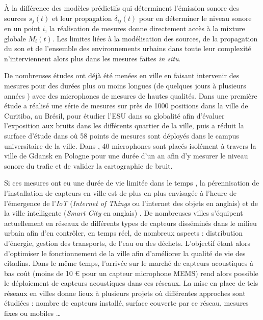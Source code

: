 À la différence des modèles prédictifs qui déterminent l'émission sonore des sources $s_j(t)$ et leur propagation $\delta_{ij}(t)$ pour en déterminer le niveau sonore en un point $i$, la réalisation de mesures donne directement accès à la mixture globale $M_{i}(t)$. Les limites liées à la modélisation des sources, de la propagation du son et de l'ensemble des environnements urbains dans toute leur complexité n'interviennent alors plus dans les mesures faites \textit{in situ}.

De nombreuses études ont déjà été menées en ville en faisant intervenir des mesures pour des durées plus ou moins longues (de quelques jours \cite{romeu2011street} à plusieurs années \cite{gaja2003sampling}) avec des microphones de mesures de hautes qualités. Dans une première étude \cite{zannin2002environmental} a réalisé une série de mesures sur près de 1000 positions dans la ville de Curitiba, au Brésil, pour étudier l'ESU dans sa globalité afin d'évaluer l'exposition aux bruits dans les différents quartier de la ville, puis a réduit la surface d'étude dans \cite{zannin_characterization_2013} où 58 points de mesures sont déployés dans le campus universitaire de la ville.
Dans \cite{Mioduszewski}, 40 microphones sont placés isolément à travers la ville de Gdansk en Pologne pour une durée d'un an afin d'y mesurer le niveau sonore du trafic et de valider la cartographie de bruit.

Si ces mesures ont eu une durée de vie limitée dans le temps , la pérennisation de l'installation de capteurs en ville est de plus en plus envisagée à l'heure de l'émergence de l'\textit{IoT} (\textit{Internet of Things} ou l'internet des objets en anglais) \cite{zanella2014internet} et de la ville intelligente (\textit{Smart City} en anglais) \cite{chourabi2012understanding}. De nombreuses villes s'équipent actuellement en réseaux de différents types de capteurs disséminés dans le milieu urbain afin d'en contrôler, en temps réel, de nombreux aspects : distribution d'énergie, gestion des transports, de l'eau ou des déchets. L'objectif étant alors d'optimiser le fonctionnement de la ville afin d'améliorer la qualité de vie des citadins. Dans le même temps, l'arrivée sur le marché de capteurs acoustiques à bas coût (moins de 10 € pour un capteur microphone MEMS) \cite{van2010use} rend alors possible le déploiement de capteurs acoustiques dans ces réseaux. La mise en place de tels réseaux en villes donne lieux à plusieurs projets où différentes approches sont étudiées : nombre de capteurs installé, surface couverte par ce réseau, mesures fixes ou mobiles \dots

